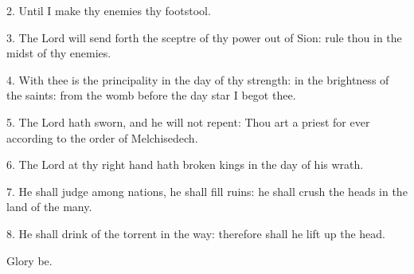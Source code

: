 
2. Until I make thy enemies thy footstool.
 
3. The Lord will send forth the sceptre of thy power out of Sion: rule thou in the midst of thy enemies.
 
4. With thee is the principality in the day of thy strength: in the brightness of the saints:
 from the womb before the day star I begot thee.
 
5. The Lord hath sworn, and he will not repent: Thou art a priest for ever according to the order of Melchisedech.
 
6. The Lord at thy right hand hath broken kings in the day of his wrath.

7. He shall judge among nations, he shall fill ruins: he shall crush the heads in the land of the many.

8. He shall drink of the torrent in the way: therefore shall he lift up the head. 

Glory be.